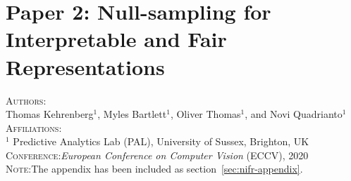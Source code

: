 \chapter{Paper 2: Null-sampling for Interpretable and Fair Representations}\label{ch:paper2}



% 

% 




\textsc{Authors}:\\
Thomas Kehrenberg$^1$, Myles Bartlett$^1$, Oliver Thomas$^1$, and Novi Quadrianto$^1$ \\
\textsc{Affiliations}:\\
$^1$ Predictive Analytics Lab (PAL), University of Sussex, Brighton, UK\\
\textsc{Conference}:\;\;\textit{European Conference on Computer Vision} (ECCV), 2020 \\
\textsc{Note}:\;\;The appendix has been included as section~\ref{sec:nifr-appendix}.


